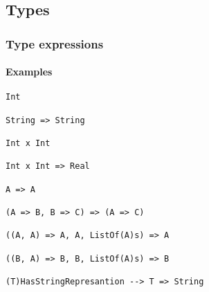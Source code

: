 \documentclass{article}
\begin{document}
\subsection{Types}
\label{subsec:types}

\subsubsection{Type expressions}

\paragraph{Examples}

\begin{verbatim}
Int

String => String 

Int x Int 

Int x Int => Real

A => A

(A => B, B => C) => (A => C)

((A, A) => A, A, ListOf(A)s) => A

((B, A) => B, B, ListOf(A)s) => B

(T)HasStringRepresantion --> T => String
\end{verbatim}
\end{document}
